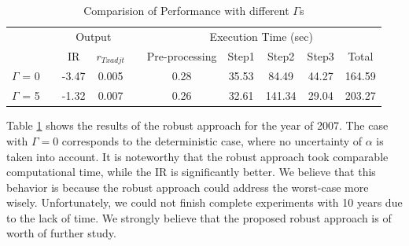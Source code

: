 \documentclass[11pt]{article}
\begin{document}
	\begin{table}[]
			\centering
		\caption{Comparision of Performance with different $\Gamma$s  }
		\label{tab:gamma}
		\begin{tabular}{cccccccccc}
			&  &  &  &  &  &  &  &  &  \\ 
			\toprule
			&  & \multicolumn{2}{c}{Output} &  & \multicolumn{5}{c}{Execution Time (sec)} \\[1mm] \cline{3-4} \cline{6-10} 
			&  & IR & $r_{Txadj t}$ &  & Pre-processing & Step1 & Step2 & Step3 & Total \\ 
			\midrule
			$\Gamma$ = 0 &  & -3.47 & 0.005 &  & 0.28 & 35.53 & 84.49 & 44.27 & 164.59 \\
			$\Gamma$ = 5 &  & -1.32 & 0.007 &  & 0.26 & 32.61 & 141.34 & 29.04 & 203.27\\ 
			\bottomrule
		\end{tabular}
	\end{table}
	Table \ref{tab:gamma} shows the results of the robust approach for the year of 2007. The case with $\Gamma=0$ corresponds to the deterministic case, where no uncertainty of $\alpha$ is taken into account. It is noteworthy that the robust approach took comparable computational time, while the IR is significantly better. We believe that this behavior is because the robust approach could address the worst-case more wisely. Unfortunately, we could not finish complete experiments with 10 years due to the lack of time. We strongly believe that the proposed robust approach is of worth of further study.
	
	
	
	
	
	
	
\end{document}
